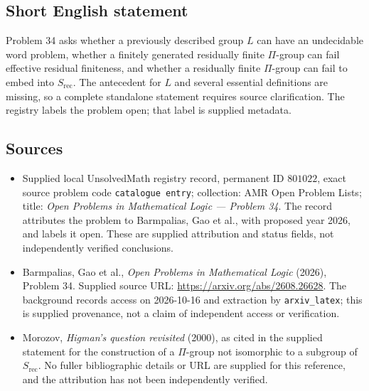 \documentclass[11pt]{article}
\begin{document}
\subsection{Short English statement}
Problem 34 asks whether a previously described group \(L\) can have an undecidable word problem, whether a finitely generated residually finite \(\Pi\)-group can fail effective residual finiteness, and whether a residually finite \(\Pi\)-group can fail to embed into \(S_{\mathrm{rec}}\). The antecedent for \(L\) and several essential definitions are missing, so a complete standalone statement requires source clarification. The registry labels the problem open; that label is supplied metadata.
\subsection{Sources}
\begin{itemize}
\item Supplied local UnsolvedMath registry record, permanent ID \(801022\), exact source problem code \texttt{catalogue entry}; collection: AMR Open Problem Lists; title: \emph{Open Problems in Mathematical Logic --- Problem 34}. The record attributes the problem to Barmpalias, Gao et al., with proposed year 2026, and labels it open. These are supplied attribution and status fields, not independently verified conclusions.
\item Barmpalias, Gao et al., \emph{Open Problems in Mathematical Logic} (2026), Problem 34. Supplied source URL: \url{https://arxiv.org/abs/2608.26628}. The background records access on 2026-10-16 and extraction by \texttt{arxiv\_latex}; this is supplied provenance, not a claim of independent access or verification.
\item Morozov, \emph{Higman's question revisited} (2000), as cited in the supplied statement for the construction of a \(\Pi\)-group not isomorphic to a subgroup of \(S_{\mathrm{rec}}\). No fuller bibliographic details or URL are supplied for this reference, and the attribution has not been independently verified.
\end{itemize}
\end{document}
